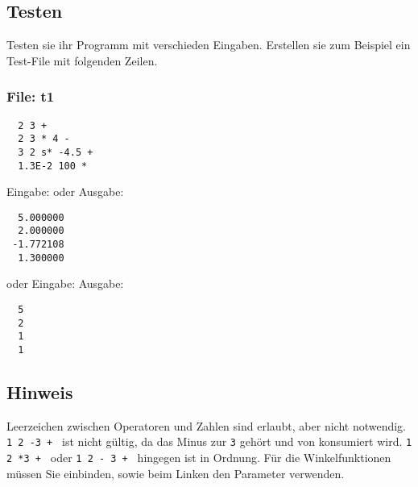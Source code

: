 \subsection*{Testen}
Testen sie ihr Programm mit verschieden Eingaben. Erstellen sie zum Beispiel ein Test-File  mit folgenden Zeilen.

\subsubsection*{File: t1}
\begin{verbatim}
  2 3 +
  2 3 * 4 -
  3 2 s* -4.5 + 
  1.3E-2 100 *
\end{verbatim}
Eingabe:  oder 
Ausgabe: 
\begin{verbatim}
  5.000000
  2.000000
 -1.772108
  1.300000
\end{verbatim}
oder
Eingabe: 
Ausgabe: 
\begin{verbatim}
  5
  2
  1
  1
\end{verbatim}

\subsection*{Hinweis}
Leerzeichen zwischen Operatoren und Zahlen sind erlaubt, aber nicht notwendig. \verb|1 2 -3 + | ist nicht gültig, da das Minus zur \verb|3| gehört und von  konsumiert wird. \verb|1 2 *3 + | oder \verb|1 2 - 3 + | hingegen ist in Ordnung.
Für die Winkelfunktionen müssen Sie  einbinden, sowie beim Linken den Parameter  verwenden.

\osueguidelinesone


